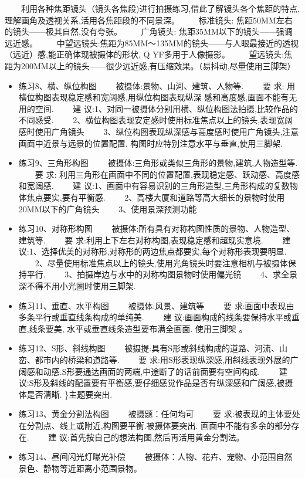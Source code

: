 \documentclass[
  letterpaper,
  DIV=11,
  numbers=noendperiod]{scrreprt}
\begin{document}
　　利用各种焦距镜头（镜头各焦段)进行拍摄练习,借此了解镜头各个焦距的特点,理解画角及透视关系,活用各焦距段的不同景深。
　　标准镜头: 焦距50MM左右的镜头------极其自然,没有夸张。 　　广角镜头:
焦距35MM以下的镜头------强调远近感。
　　中望远镜头:焦距为85MM～135MM的镜头------与人眼最接近的透视（远近）感,能正确体现被摄体的形状,
Q YF多用于人像摄影。
　　望远镜头:焦距为200MM以上的镜头------很少远近感,有压缩效果。（易抖动,尽量使用三脚架）

\begin{itemize}
\item
  练习8、横、纵位构图 　　被摄体:景物、山河、建筑、人物等. 　　要 求:
  用横位构图表现稳定感和宽阔感,用纵位构图表现纵深
  感和高度感,画面不能有无用的空间. 　　建
  议:1、对同一被摄体分别用横、纵位构图法拍摄,比较作品的不同感受.
  　　2、横位构图表现安定感时使用标准焦点以上的镜头,表现宽阔感时使用广角镜头
  　　3、纵位构图表现纵深感与高度感时使用广角镜头,注意画面中近景与远景的位置配置.
  构图时应特别注意水平与垂直,使用三脚架.
\item
  练习9、三角形构图 　　被摄体:三角形或类似三角形的景物,建筑,人物造型等.
  　　要 求:
  利用三角形在画面中不同的位置配置,表现稳定感、跃动感、高度感和宽阔感.
  　　建
  议:1、画面中有容易识别的三角形造型,三角形构成的复数物体焦点要实,要有平衡感.
  　　2、高楼大厦和道路等高大细长的景物时使用20MM以下的广角镜头
  　　3、使用景深预测功能
\item
  练习10、对称形构图
  　　被摄体:所有具有对称构图性质的景物、人物造型、建筑等. 　　要
  求:利用上下左右对称构图,表现稳定感和超现实意境. 　　建
  议:1、选择优美的对称形,对称形的两边焦点都要实,每个对称形表现要明显.
  　　2、尽量使用标准焦点以上的镜头,使用光角镜头时要注意相机与被摄体保持平行.
  　　3、拍摄岸边与水中的对称构图景物时使用偏光镜
  　　4、求全景深不得不用小光圈时使用三脚架.
\item
  练习11、垂直、水平构图 　　被摄体:风景、建筑等 　　要
  求:画面中表现由多条平行或垂直线条构成的单纯美. 　　建
  议:画面构成的线条要保持水平或垂直,线条要美,
  水平或垂直线条造型要布满全画面. 使用三脚架 。
\item
  练习12、S形、斜线构图
  　　被摄提:具有S形或斜线构成的道路、河流、山峦、都市内的桥梁和道路等.
  　　要
  求:用S形表现纵深感,用斜线表现外展的广阔感和动感.S形要通达画面的两端,中途断了的话前面要有空间构成.
  　　建
  议:S形及斜线的配置要有平衡感,要仔细感觉作品是否有纵深感和广阔感,被摄体是否清晰.
  \}主题要突出.
\item
  练习13、黄金分割法构图 　　被摄题：任何均可 　　要
  求:被表现的主体要处在分割点、线上或附近,构图要平衡.被摄体要突出.
  画面中不能有多余的部分存在. 　　建
  议:首先按自己的想法构图,然后再活用黄金分割法。
\item
  练习14、昼间闪光灯曝光补偿
  　　被摄体：人物、花卉、宠物、小范围自然景色、静物等近距离小范围景物。
\end{itemize}
\end{document}
